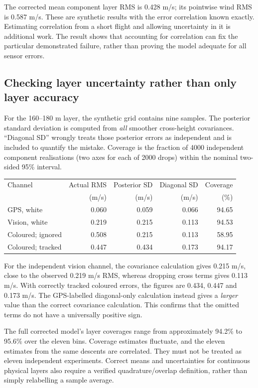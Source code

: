 \documentclass[11pt,a4paper]{article}
\numberwithin{equation}{section}
\begin{document}
The corrected mean component layer RMS is 0.428 m/s; its pointwise wind RMS is 0.587 m/s. These are synthetic results with the error correlation known exactly. Estimating correlation from a short flight and allowing uncertainty in it is additional work. The result shows that accounting for correlation can fix the particular demonstrated failure, rather than proving the model adequate for all sensor errors.

\subsection{Checking layer uncertainty rather than only layer accuracy}
For the 160--180 m layer, the synthetic grid contains nine samples. The posterior standard deviation is computed from \emph{all} smoother cross-height covariances. ``Diagonal SD'' wrongly treats those posterior errors as independent and is included to quantify the mistake. Coverage is the fraction of 4000 independent component realisations (two axes for each of 2000 drops) within the nominal two-sided 95\% interval.
\begin{center}
\begin{tabular}{lrrrr}
\toprule
Channel & Actual RMS & Posterior SD & Diagonal SD & Coverage\\
 & (m/s) & (m/s) & (m/s) & (\%)\\
\midrule
GPS, white & 0.060 & 0.059 & 0.066 & 94.65\\
Vision, white & 0.219 & 0.215 & 0.113 & 94.53\\
Coloured; ignored & 0.508 & 0.215 & 0.113 & 58.95\\
Coloured; tracked & 0.447 & 0.434 & 0.173 & 94.17\\
\bottomrule
\end{tabular}
\end{center}
For the independent vision channel, the covariance calculation gives 0.215 m/s, close to the observed 0.219 m/s RMS, whereas dropping cross terms gives 0.113 m/s. With correctly tracked coloured errors, the figures are 0.434, 0.447 and 0.173 m/s. The GPS-labelled diagonal-only calculation instead gives a \emph{larger} value than the correct covariance calculation. This confirms that the omitted terms do not have a universally positive sign.

The full corrected model's layer coverages range from approximately 94.2\% to 95.6\% over the eleven bins. Coverage estimates fluctuate, and the eleven estimates from the same descents are correlated. They must not be treated as eleven independent experiments. Correct means and uncertainties for continuous physical layers also require a verified quadrature/overlap definition, rather than simply relabelling a sample average.
\end{document}
